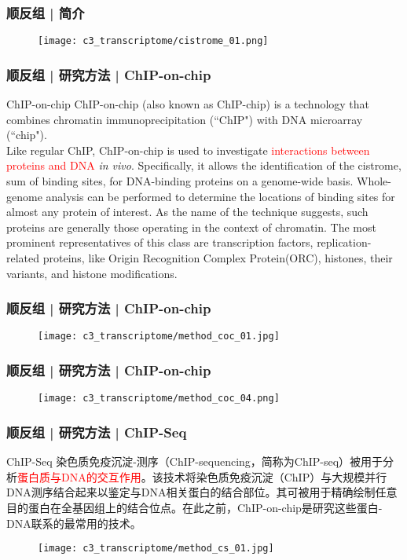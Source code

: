 \begin{frame}
  \frametitle{顺反组 | 简介}
  \begin{figure}
    \centering
    \texttt{[image: c3\_transcriptome/cistrome\_01.png]}
  \end{figure}
\end{frame}

\begin{frame}
  \frametitle{顺反组 | 研究方法 | ChIP-on-chip}
  \begin{block}{ChIP-on-chip}
    ChIP-on-chip (also known as ChIP-chip) is a technology that combines chromatin immunoprecipitation (``ChIP") with DNA microarray (``chip").\\
    \vspace{1em}
    Like regular ChIP, ChIP-on-chip is used to investigate \textcolor{red}{interactions between proteins and DNA} \textit{in vivo}. Specifically, it allows the identification of the cistrome, sum of binding sites, for DNA-binding proteins on a genome-wide basis. Whole-genome analysis can be performed to determine the locations of binding sites for almost any protein of interest. As the name of the technique suggests, such proteins are generally those operating in the context of chromatin. The most prominent representatives of this class are transcription factors, replication-related proteins, like Origin Recognition Complex Protein(ORC), histones, their variants, and histone modifications.
  \end{block}
\end{frame}

\begin{frame}
  \frametitle{顺反组 | 研究方法 | ChIP-on-chip}
  \begin{figure}
    \centering
    \texttt{[image: c3\_transcriptome/method\_coc\_01.jpg]}
  \end{figure}
\end{frame}

\begin{frame}
  \frametitle{顺反组 | 研究方法 | ChIP-on-chip}
  \begin{figure}
    \centering
    \texttt{[image: c3\_transcriptome/method\_coc\_04.png]}
  \end{figure}
\end{frame}

\begin{frame}
  \frametitle{顺反组 | 研究方法 | ChIP-Seq}
  {\footnotesize
  \begin{block}{ChIP-Seq}
    染色质免疫沉淀-测序（ChIP-sequencing，简称为ChIP-seq）被用于分析\textcolor{red}{蛋白质与DNA的交互作用}。该技术将染色质免疫沉淀（ChIP）与大规模并行DNA测序结合起来以鉴定与DNA相关蛋白的结合部位。其可被用于精确绘制任意目的蛋白在全基因组上的结合位点。在此之前，ChIP-on-chip是研究这些蛋白-DNA联系的最常用的技术。
  \end{block}
  }
  \begin{figure}
    \centering
    \texttt{[image: c3\_transcriptome/method\_cs\_01.jpg]}
  \end{figure}
\end{frame}

